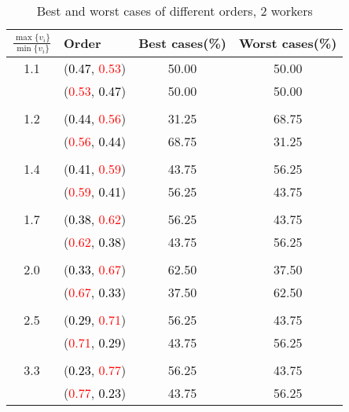 \documentclass[10pt,a4paper]{report}
\begin{document}
    \begin{center}
	\small
	\begin{longtable}{clcc}
		\caption{Best and worst cases of different orders, 2 workers}\\
		\toprule
		\setlength{\tabcolsep}{1mm}
		\renewcommand\baselinestretch{0.5}\selectfont
		$\frac{\max\{v_i\}}{\min\{v_i\}}$ & Order & Best cases(\%) & Worst cases(\%) \\
			\midrule		1.1			&(\textcolor{black}{0.47}, \textcolor{red}{0.53})&50.00&50.00\\
			&(\textcolor{red}{0.53}, \textcolor{black}{0.47})&50.00&50.00\\
		&&&\\
		1.2			&(\textcolor{black}{0.44}, \textcolor{red}{0.56})&31.25&68.75\\
			&(\textcolor{red}{0.56}, \textcolor{black}{0.44})&68.75&31.25\\
		&&&\\
		1.4			&(\textcolor{black}{0.41}, \textcolor{red}{0.59})&43.75&56.25\\
			&(\textcolor{red}{0.59}, \textcolor{black}{0.41})&56.25&43.75\\
		&&&\\
		1.7			&(\textcolor{black}{0.38}, \textcolor{red}{0.62})&56.25&43.75\\
			&(\textcolor{red}{0.62}, \textcolor{black}{0.38})&43.75&56.25\\
		&&&\\
		2.0			&(\textcolor{black}{0.33}, \textcolor{red}{0.67})&62.50&37.50\\
			&(\textcolor{red}{0.67}, \textcolor{black}{0.33})&37.50&62.50\\
		&&&\\
		2.5			&(\textcolor{black}{0.29}, \textcolor{red}{0.71})&56.25&43.75\\
			&(\textcolor{red}{0.71}, \textcolor{black}{0.29})&43.75&56.25\\
		&&&\\
		3.3			&(\textcolor{black}{0.23}, \textcolor{red}{0.77})&56.25&43.75\\
			&(\textcolor{red}{0.77}, \textcolor{black}{0.23})&43.75&56.25\\
		\bottomrule
	\end{longtable}
\end{center}
\end{document}
